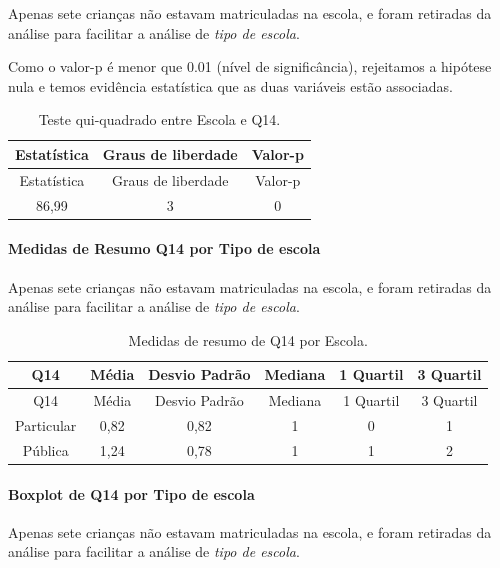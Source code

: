 \documentclass[]{article}
\let\oldparagraph\paragraph
\renewcommand{\paragraph}[1]{\oldparagraph{#1}\mbox{}}
\begin{document}
Apenas sete crianças não estavam matriculadas na escola, e foram retiradas da análise para facilitar a análise de \emph{tipo de escola}.

Como o valor-p é menor que 0.01 (nível de significância), rejeitamos a hipótese nula e temos evidência estatística que as duas variáveis estão associadas.

\begin{longtable}[]{@{}ccc@{}}
\caption{\label{tab:unnamed-chunk-55}Teste qui-quadrado entre Escola e Q14.}\tabularnewline
\toprule
Estatística & Graus de liberdade & Valor-p\tabularnewline
\midrule
\endfirsthead
\toprule
Estatística & Graus de liberdade & Valor-p\tabularnewline
\midrule
\endhead
86,99 & 3 & 0\tabularnewline
\bottomrule
\end{longtable}

\cleardoublepage

\hypertarget{medidas-de-resumo-q14-por-tipo-de-escola}{%
\paragraph{Medidas de Resumo Q14 por Tipo de escola}\label{medidas-de-resumo-q14-por-tipo-de-escola}}

Apenas sete crianças não estavam matriculadas na escola, e foram retiradas da análise para facilitar a análise de \emph{tipo de escola}.

\begin{longtable}[]{@{}cccccc@{}}
\caption{\label{tab:unnamed-chunk-56}Medidas de resumo de Q14 por Escola.}\tabularnewline
\toprule
Q14 & Média & Desvio Padrão & Mediana & 1 Quartil & 3 Quartil\tabularnewline
\midrule
\endfirsthead
\toprule
Q14 & Média & Desvio Padrão & Mediana & 1 Quartil & 3 Quartil\tabularnewline
\midrule
\endhead
Particular & 0,82 & 0,82 & 1 & 0 & 1\tabularnewline
Pública & 1,24 & 0,78 & 1 & 1 & 2\tabularnewline
\bottomrule
\end{longtable}

\hypertarget{boxplot-de-q14-por-tipo-de-escola}{%
\paragraph{Boxplot de Q14 por Tipo de escola}\label{boxplot-de-q14-por-tipo-de-escola}}

Apenas sete crianças não estavam matriculadas na escola, e foram retiradas da análise para facilitar a análise de \emph{tipo de escola}.
\end{document}
